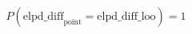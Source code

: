 \documentclass[preview]{standalone}
\begin{document}
\begin{equation}
\tag{8}
    P ( {\mathrm{elpd\_diff}}_{\mathrm{point}} = \mathrm{elpd\_diff\_loo} ) = 1
\end{equation}
\end{document}

